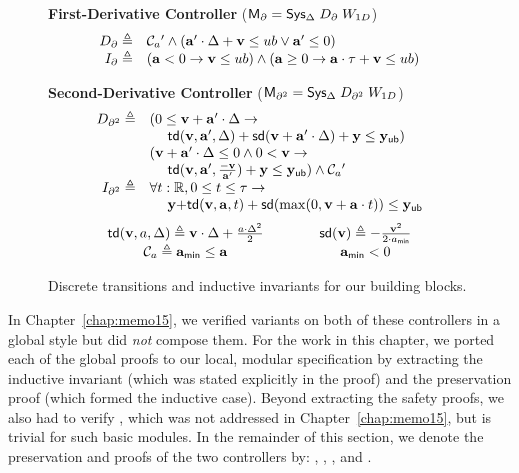 \begin{figure}[t]

\textbf{First-Derivative Controller} (${\mathsf{M}_\partial} = {\textsf{Sys}}{}_{\Delta}\;D_\partial\;W_{1D}$)
\[\begin{array}{rl}
D_\partial \triangleq & \mathcal{C}_{a}{}^\prime \wedge (\mathbf{a}^\prime \cdot \Delta + \mathbf{v} \leq ub \vee \mathbf{a}^\prime \leq 0) \\
{I_{\partial}} \triangleq & (\mathbf{a} < 0 \rightarrow \mathbf{v} \leq ub) \wedge
(\mathbf{a} \geq 0 \rightarrow \mathbf{a} \cdot \mathbf{\tau} + \mathbf{v} \leq ub) \\
\end{array}
\]

\textbf{Second-Derivative Controller} (${\mathsf{M}_{\partial^2}} = {\textsf{Sys}}{}_{\Delta}\;D_{\partial^2}\;W_{1D}$)
\[
\begin{array}{rl}
D_{\partial^2} \triangleq & (0 \leq \mathbf{v} + \mathbf{a}^\prime \cdot \Delta \rightarrow \\
& \;\quad \mathsf{td}(\mathbf{v},\mathbf{a}^\prime,\Delta) + \mathsf{sd}(\mathbf{v} + \mathbf{a}^\prime\cdot\Delta) + \mathbf{y} \leq \mathsf{\mathbf{y}_{ub}}) \\
& (\mathbf{v} + \mathbf{a}^\prime \cdot \Delta \leq 0 \wedge 0 < \mathbf{v} \rightarrow \\
& \;\quad \mathsf{td}(\mathbf{v},\mathbf{a}^\prime,\frac{-\mathbf{v}}{\mathbf{a}^\prime}) + \mathbf{y} \leq \mathsf{\mathbf{y}_{ub}}) \wedge \mathcal{C}_{a}{}^\prime \\
{I_{\partial^2}} \triangleq & \forall t : \mathbb{R}, 0 \leq t \leq \mathbf{\tau} \rightarrow \\
& \;\quad \mathbf{\mathbf{y}} {+} \mathsf{td}(\mathbf{\mathbf{v}},\mathbf{a},t) + \mathsf{sd}(\max(0,\mathbf{\mathbf{v}} + \mathbf{a} \cdot t)) \leq \mathsf{\mathbf{y}_{ub}}
\end{array}
\]
\[
\begin{array}{ccc}
\mathsf{td}(\mathbf{v},a,\Delta) \triangleq \mathbf{v}\cdot\Delta+\frac{a\cdot\Delta^2}{2} & \qquad &
\mathsf{sd}(\mathbf{v}) \triangleq -\frac{\mathbf{v}^2}{2\cdot a_{\mathsf{min}}} \\
\mathcal{C}_{a} \triangleq \mathbf{a}_{\mathsf{min}} \leq \mathbf{a} & \qquad & \mathbf{a}_{\mathsf{min}}  < 0
\end{array}
\]

\caption{Discrete transitions and inductive invariants for our building blocks.}
\label{fig:formal-monitors}
\end{figure}

In Chapter~\ref{chap:memo15}, we verified variants on both of these
controllers in a global style but did \emph{not} compose them.  For the
work in this chapter, we ported each of the global proofs to our local,
modular specification by extracting the inductive invariant (which was
stated explicitly in the proof) and the preservation proof (which formed
the inductive case).  Beyond extracting the safety proofs, we also had to
verify \progress{}, which was not addressed in Chapter~\ref{chap:memo15},
but is trivial for such basic modules.  In the remainder of this section,
we denote the preservation and \progress{} proofs of the two controllers
by: ,
\ProofRule{$\partial$-\xmakefirstuc{\progress{}}},
, and
.

